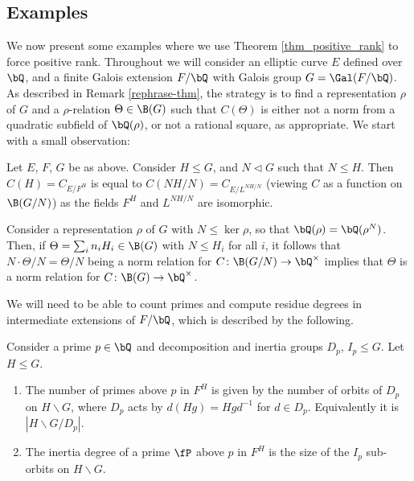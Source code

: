 \subsection{Examples}

We now present some examples where we use Theorem \ref{thm_positive_rank} to force positive rank. Throughout we will consider an elliptic curve $E$ defined over $\bQ$, and a finite Galois extension $F / \bQ$ with Galois group $G = \Gal(F / \bQ)$. As described in Remark \ref{rephrase-thm}, the strategy is to find a representation $\rho$ of $G$ and a $\rho$-relation $\Theta \in \B(G)$ such that $C(\Theta)$ is either not a norm from a quadratic subfield of $\bQ(\rho)$, or not a rational square, as appropriate. We start with a small observation:

\begin{rem}
    Let $E$, $F$, $G$ be as above. Consider $H \leq G$, and $N \triangleleft G$ such that $N \leq H$. Then $C(H) = C_{E / F^H}$ is equal to $C(NH/N) = C_{E / L^{NH/N}}$ (viewing $C$ as a function on $\B(G / N)$) as the fields $F^H$ and $L^{NH/ N}$ are isomorphic. 
    
    Consider a representation $\rho$ of $G$ with $N \leq \ker \rho$, so that $\bQ(\rho) = \bQ(\rho^N)$. Then, if $\Theta = \sum_i n_i H_i \in \B(G)$ with $N \leq H_i$ for all $i$, it follows that $N \cdot \Theta / N = \Theta / N$ being a norm relation for $C \colon \B(G / N) \to \bQ^{\times}$ implies that $\Theta$ is a norm relation for $C \colon \B(G) \to \bQ^{\times}$. 
\end{rem}

We will need to be able to count primes and compute residue degrees in intermediate extensions of $F / \bQ$, which is described by the following. 

\begin{exercise}
Consider a prime $p \in \bQ$ and decomposition and inertia groups $D_p$, $I_p \leq G$. Let $H \leq G$. 
\begin{enumerate}
    \setlength\itemsep{0em}
    \item The number of primes above $p$ in $F^H$ is given by the number of orbits of $D_p$ on $H \backslash G$, where $D_p$ acts by $d(Hg) = H g d^{-1}$ for $d \in D_p$. Equivalently it is $|H \backslash G / D_p|$.
    \item The inertia degree of a prime $\fP$ above $p$ in $F^H$ is the size of the $I_p$ sub-orbits on $H \backslash G$. 
\end{enumerate}
\end{exercise}


